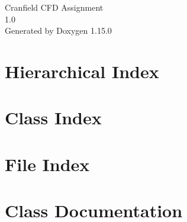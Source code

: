 \documentclass[twoside]{book}
\newcommand{\+}{\discretionary{\mbox{\scriptsize$\hookleftarrow$}}{}{}}
\newcommand{\clearemptydoublepage}{%
    \newpage{\pagestyle{empty}\cleardoublepage}%
  }
\begin{document}
  \raggedbottom
    \hypersetup{pageanchor=false,
                bookmarksnumbered=true,
                pdfencoding=unicode
               }
  \begin{titlepage}
  \vspace*{7cm}
  \begin{center}%
  {\Large Cranfield CFD Assignment}\\
  [1ex]\large 1.\+0 \\
  \vspace*{1cm}
  {\large Generated by Doxygen 1.15.0}\\
  \end{center}
  \end{titlepage}
  \clearemptydoublepage
  \tableofcontents
  \clearemptydoublepage
  \hypersetup{pageanchor=true}

\chapter{Hierarchical Index}

\chapter{Class Index}

\chapter{File Index}

\chapter{Class Documentation}








\end{document}
